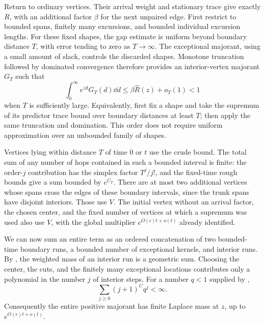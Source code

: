 Return to ordinary vertices. Their arrival weight and stationary
trace give exactly $R$, with an additional factor $\beta$ for the
next unpaired edge. First restrict to bounded spans, finitely many
excursions, and bounded individual excursion lengths. For these
fixed shapes, the gap estimate is uniform beyond boundary distance
$T$, with error tending to zero as $T\to\infty$. The exceptional
majorant, using a small amount of slack, controls the discarded
shapes. Monotone truncation followed by dominated
convergence therefore provides an interior-vertex majorant $G_T$
such that
\begin{equation}\label{eq:hidden-interior-mass}
 \int_0^\infty e^{zd}G_T(d)\dd d
 \leq\beta\widehat R(z)+o_T(1)<1
\end{equation}
when $T$ is sufficiently large. Equivalently, first fix a shape and take the supremum of its predictor
trace bound over boundary distances at least $T$; then apply the
same truncation and domination. This order does not require uniform
approximation over an unbounded family of shapes.

Vertices lying within distance $T$ of time $0$ or $t$ use the crude
bound. The total sum of any number of hops contained in such a
bounded interval is finite: the order-$j$ contribution has the
simplex factor $T^j/j!$, and the fixed-time rough bounds give a sum
bounded by $e^{C_T}$. There are at most two additional vertices whose
spans cross the edges of these boundary intervals, since the trunk
spans have disjoint interiors. Those use $V$. The initial vertex
without an arrival factor, the chosen center, and the fixed number
of vertices at which a supremum was used also use $V$, with the
global multiplier $e^{O(\epsilon)t+o(t)}$ already identified.

We can now sum an entire term as an ordered concatenation of two
bounded-time boundary runs, a bounded number of exceptional kernels,
and interior runs. By , the weighted
mass of an interior run is a geometric sum. Choosing the center,
the cuts, and the finitely many exceptional locations contributes
only a polynomial in the number $j$ of interior steps. For a number
$q<1$ supplied by ,
\[
 \sum_{j\geq0}(j+1)^Cq^j<\infty.
\]
Consequently the entire positive majorant has finite Laplace mass at
$z$, up to $e^{O(\epsilon)t+o(t)}$.

